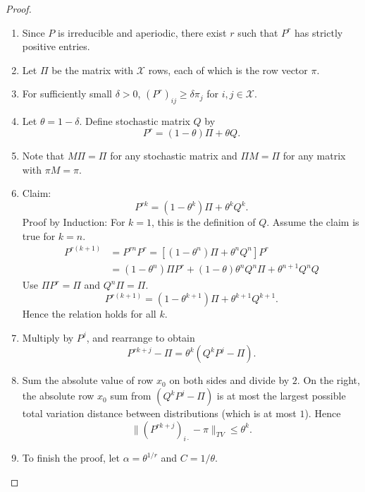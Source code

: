 \documentclass[12pt]{article}
\begin{document}
\begin{enumerate}
\begin{proof}
    \begin{enumerate}
        \item
            Since \( P \) is irreducible and aperiodic, there exist \( r
            \) such that \( P^r \) has strictly positive entries.
        \item
            Let \( \Pi \) be the matrix with \( \mathcal{X} \) rows,
            each of which is the row vector \( \pi \).
        \item
            For sufficiently small \( \delta > 0 \), \( (P^r)_{ij} \ge
            \delta \pi_{j} \) for \( i,j \in \mathcal{X} \).
        \item
            Let \( \theta = 1-\delta \).  Define stochastic matrix \( Q \)
            by
            \[
                P^r = (1 - \theta)\Pi + \theta Q.
            \]
        \item
            Note that \( M \Pi = \Pi \) for any stochastic matrix and \(
            \Pi M =\Pi \) for any matrix with \( \pi M = \pi \).
        \item
            Claim:
            \[
                P^{rk} = (1- \theta^{k})\Pi + \theta^k Q^k.
            \] Proof by Induction:  For \( k=1 \), this is the
            definition of \( Q \).  Assume the claim is true for \( k=n \).
            \begin{align*}
                P^{r(k+1)} &= P^{rn} P^r = [(1-\theta^n)\Pi + \theta^n Q^n]P^r
                \\
                &= (1-\theta^n)\Pi P^r + (1-\theta) \theta^n Q^n \Pi +
                \theta^{n+1} Q^n Q
            \end{align*}
            Use \( \Pi P^r = \Pi \) and \( Q^n \Pi = \Pi \).
            \[
                P^{r(k+1)} = (1- \theta^{k+1})\Pi + \theta^{k+1} Q^{k+1}.
            \] Hence the relation holds for all \( k \).
        \item
            Multiply by \( P^j \), and rearrange to obtain
            \[
                P^{rk+j} - \Pi = \theta^k (Q^k P^j - \Pi).
            \]
        \item
            Sum the absolute value of row \( x_0 \) on both sides and
            divide by \( 2 \).  On the right, the absolute row \( x_0 \)
            sum from \( (Q^k P^j - \Pi) \) is at most the largest
            possible total variation distance between distributions (which
            is at most \( 1 \)).  Hence
            \[
                \| (P^{rk+j})_{i \cdot} - \pi \|_{TV} \le \theta^k.
            \]
        \item
            To finish the proof, let \( \alpha = \theta^{1/r} \) and \(
            C= 1/\theta \).
    \end{enumerate}
\end{proof}


\end{enumerate}
\end{document}

